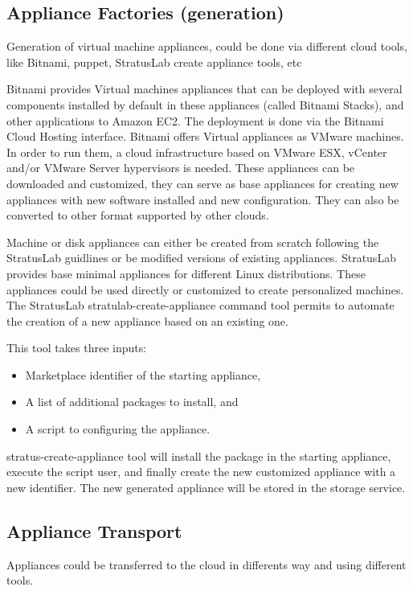 \subsection{Appliance Factories (generation)}

Generation of virtual machine appliances, could be done via different
cloud tools, like Bitnami, puppet, StratusLab create appliance tools,
etc

Bitnami provides Virtual machines appliances that can be deployed with
several components installed by default in these appliances (called
Bitnami Stacks), and other applications to Amazon EC2. The deployment
is done via the Bitnami Cloud Hosting interface. Bitnami offers
Virtual appliances as VMware machines. In order to run them, a cloud
infrastructure based on VMware ESX, vCenter and/or VMware Server
hypervisors is needed. These appliances can be downloaded and
customized, they can serve as base appliances for creating new
appliances with new software installed and new configuration. They can
also be converted to other format supported by other clouds.

Machine or disk appliances can either be created from scratch
following the StratusLab guidlines or be modified versions of existing
appliances.  StratusLab provides base minimal appliances for different
Linux distributions. These appliances could be used directly or
customized to create personalized machines.  The StratusLab
stratulab-create-appliance command tool permits to automate the
creation of a new appliance based on an existing one.
 
This tool takes three inputs:
\begin{itemize}
\item Marketplace identifier of the starting appliance,
\item A list of additional packages to install, and
\item A script to configuring the appliance.
\end{itemize}
stratus-create-appliance tool will install the package in the starting
appliance, execute the script user, and finally create the new
customized appliance with a new identifier.  The new generated
appliance will be stored in the storage service.

\subsection{Appliance Transport}

Appliances could be transferred to the cloud in differents way and
using different tools.

